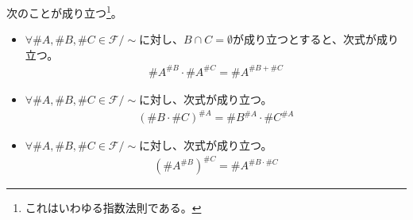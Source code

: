 \documentclass[dvipdfmx]{jsarticle}
\begin{document}
\begin{thm}\label{1.2.8.8}
次のことが成り立つ\footnote{これはいわゆる指数法則である。}。
\begin{itemize}
\item
  $\forall\# A,\# B,\# C \in \mathcal{F} /\sim $に対し、$B \cap C = \emptyset $が成り立つとすると、次式が成り立つ。
\begin{align*}
{\# A}^{\# B} \cdot {\# A}^{\# C} = {\# A}^{\# B + \# C}
\end{align*}
\item
  $\forall\# A,\# B,\# C \in \mathcal{F} /\sim $に対し、次式が成り立つ。
\begin{align*}
\left( \# B \cdot \# C \right)^{\# A} = {\# B}^{\# A} \cdot {\# C}^{\# A}
\end{align*}
\item
  $\forall\# A,\# B,\# C \in \mathcal{F} /\sim $に対し、次式が成り立つ。
\begin{align*}
\left( {\# A}^{\# B} \right)^{\# C} = {\# A}^{\# B \cdot \# C}
\end{align*}
\end{itemize}
\end{thm}
\end{document}
